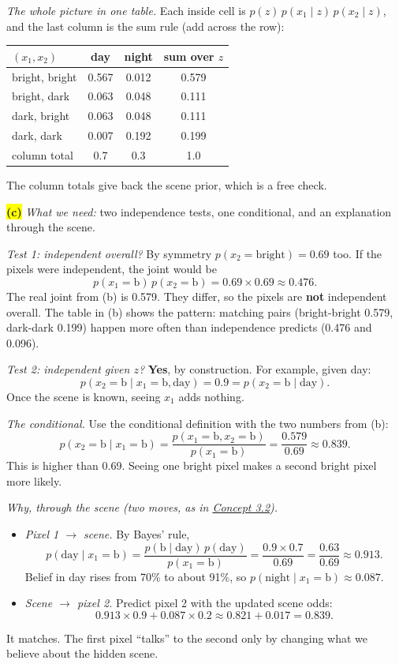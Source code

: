 \documentclass[12pt,a4paper]{article}
\begin{document}
\emph{The whole picture in one table.} Each inside cell is $p(z)\,p(x_1\mid z)\,p(x_2\mid z)$, and the last column is the sum rule (add across the row):
\begin{center}
\begin{tabular}{@{}lccc@{}}
\toprule
$(x_1,x_2)$ & day & night & sum over $z$ \\
\midrule
bright, bright & 0.567 & 0.012 & 0.579 \\
bright, dark & 0.063 & 0.048 & 0.111 \\
dark, bright & 0.063 & 0.048 & 0.111 \\
dark, dark & 0.007 & 0.192 & 0.199 \\
\midrule
column total & 0.7 & 0.3 & 1.0 \\
\bottomrule
\end{tabular}
\end{center}
The column totals give back the scene prior, which is a free check.

\colorbox{yellow}{\textbf{(c)}} \emph{What we need:} two independence tests, one conditional, and an explanation through the scene.

\emph{Test 1: independent overall?} By symmetry $p(x_2=\text{bright})=0.69$ too. If the pixels were independent, the joint would be
\[
p(x_1=\text{b})\,p(x_2=\text{b})=0.69\times0.69\approx0.476 .
\]
The real joint from (b) is 0.579. They differ, so the pixels are \textbf{not} independent overall. The table in (b) shows the pattern: matching pairs (bright-bright 0.579, dark-dark 0.199) happen more often than independence predicts (0.476 and 0.096).

\emph{Test 2: independent given $z$?} \textbf{Yes}, by construction. For example, given day:
\[
p(x_2=\text{b}\mid x_1=\text{b},\text{day})=0.9=p(x_2=\text{b}\mid\text{day}).
\]
Once the scene is known, seeing $x_1$ adds nothing.

\emph{The conditional.} Use the conditional definition with the two numbers from (b):
\[
p(x_2=\text{b}\mid x_1=\text{b})=\frac{p(x_1=\text{b},x_2=\text{b})}{p(x_1=\text{b})}=\frac{0.579}{0.69}\approx0.839 .
\]
This is higher than 0.69. Seeing one bright pixel makes a second bright pixel more likely.

\emph{Why, through the scene (two moves, as in \hyperref[c3-2]{Concept 3.2}).}
\begin{itemize}[nosep]
  \item \emph{Pixel 1 $\to$ scene.} By Bayes' rule,
  \[
  p(\text{day}\mid x_1=\text{b})=\frac{p(\text{b}\mid\text{day})\,p(\text{day})}{p(x_1=\text{b})}=\frac{0.9\times0.7}{0.69}=\frac{0.63}{0.69}\approx0.913 .
  \]
  Belief in day rises from 70\% to about 91\%, so $p(\text{night}\mid x_1=\text{b})\approx0.087$.
  \item \emph{Scene $\to$ pixel 2.} Predict pixel 2 with the updated scene odds:
  \[
  0.913\times0.9+0.087\times0.2\approx0.821+0.017=0.839 .
  \]
\end{itemize}
It matches. The first pixel ``talks'' to the second only by changing what we believe about the hidden scene.
\end{document}
